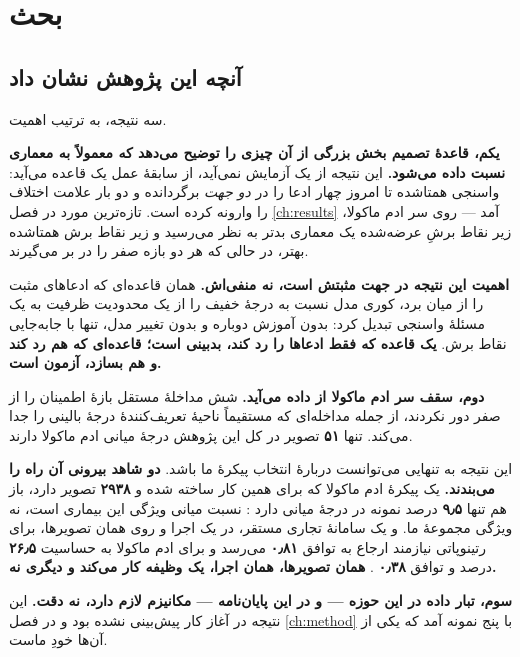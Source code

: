 
\chapter{بحث}
\label{ch:discussion}

\section{آنچه این پژوهش نشان داد}

سه نتیجه، به ترتیب اهمیت.

\textbf{یکم، قاعدهٔ تصمیم بخش بزرگی از آن چیزی را توضیح می‌دهد که معمولاً به معماری نسبت داده
می‌شود.} این نتیجه از یک آزمایش نمی‌آید، از سابقهٔ عمل یک قاعده می‌آید: واسنجی همتاشده تا امروز
چهار ادعا را در \emph{دو جهت} برگردانده و دو بار علامت اختلاف را وارونه کرده است. تازه‌ترین
مورد در فصل \ref{ch:results} آمد — روی سر ادم ماکولا، زیر نقاط برشِ عرضه‌شده یک معماری بدتر
به نظر می‌رسید و زیر نقاط برش همتاشده بهتر، در حالی که هر دو بازه صفر را در بر می‌گیرند.

\textbf{اهمیت این نتیجه در جهت مثبتش است، نه منفی‌اش.} همان قاعده‌ای که ادعاهای مثبت را از میان
برد، کوری مدل نسبت به درجهٔ خفیف را از یک محدودیت ظرفیت به یک مسئلهٔ واسنجی تبدیل کرد: بدون
آموزش دوباره و بدون تغییر مدل، تنها با جابه‌جایی نقاط برش. \textbf{یک قاعده که فقط ادعاها را
رد کند، بدبینی است؛ قاعده‌ای که هم رد کند و هم بسازد، آزمون است.}

\textbf{دوم، سقف سر ادم ماکولا از داده می‌آید.} شش مداخلهٔ مستقل بازهٔ اطمینان را از صفر دور
نکردند، از جمله مداخله‌ای که مستقیماً ناحیهٔ تعریف‌کنندهٔ درجهٔ بالینی را جدا می‌کند. تنها
\textbf{\num{۵۱}} تصویر در کل این پژوهش درجهٔ میانی ادم ماکولا دارند.

این نتیجه به تنهایی می‌توانست دربارهٔ انتخاب پیکرهٔ ما باشد. \textbf{دو شاهد بیرونی آن راه را
می‌بندند.} یک پیکرهٔ ادم ماکولا که برای همین کار ساخته شده و \textbf{\num{۲۹۳۸}} تصویر دارد، باز هم
تنها \textbf{\num{۹٫۵}} درصد نمونه در درجهٔ میانی دارد \cite{tang2026mmrdr}: نسبت میانی ویژگی این
بیماری است، نه ویژگی مجموعهٔ ما. و یک سامانهٔ تجاری مستقر، در یک اجرا و روی همان تصویرها، برای
رتینوپاتی نیازمند ارجاع به توافق \textbf{\num{۰٫۸۱}} می‌رسد و برای ادم ماکولا به حساسیت
\textbf{\num{۲۶٫۵}} درصد و توافق \textbf{\num{۰٫۳۸}} \cite{duggal2025realworld}. \textbf{همان تصویرها،
همان اجرا، یک وظیفه کار می‌کند و دیگری نه.}

\textbf{سوم، تبار داده در این حوزه — و در این پایان‌نامه — مکانیزم لازم دارد، نه دقت.} این
نتیجه در آغاز کار پیش‌بینی نشده بود و در فصل \ref{ch:method} با پنج نمونه آمد که یکی از آن‌ها
خودِ ماست.

